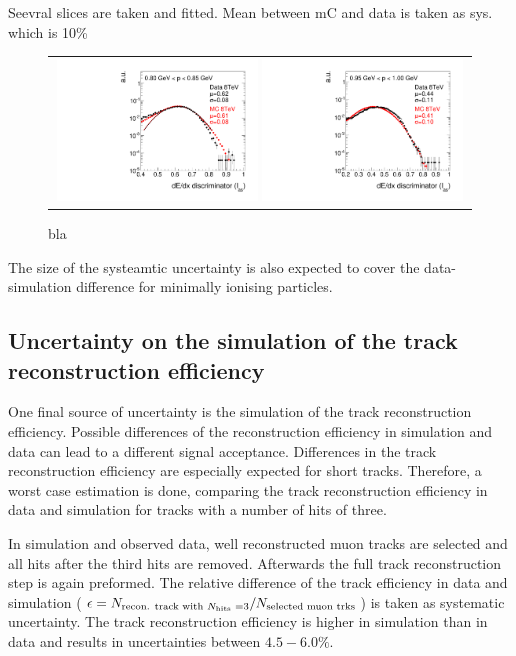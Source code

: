 Seevral slices are taken and fitted.
Mean between mC and data is taken as sys. which is 10\%
\begin{figure}[!h]
  \centering 
  \begin{tabular}{c}
    \includegraphics[width=0.49\textwidth]{figures/analysis/Interpretation/hIas_analysis_2015_11_30_ForThesis_ptmin0p80_ptmax0p85.pdf} 
    \includegraphics[width=0.49\textwidth]{figures/analysis/Interpretation/hIas_analysis_2015_11_30_ForThesis_ptmin0p95_ptmax1p0.pdf}
  \end{tabular}
  \caption{bla}
  \label{fig:optimisation}
\end{figure} 
The size of the systeamtic uncertainty is also expected to cover the data-simulation difference for minimally ionising particles.


\subsection*{Uncertainty on the simulation of the track reconstruction efficiency}
One final source of uncertainty is the simulation of the track reconstruction efficiency.
Possible differences of the reconstruction efficiency in simulation and data can lead to a different signal acceptance.
Differences in the track reconstruction efficiency are especially expected for short tracks.
Therefore, a worst case estimation is done, comparing the track reconstruction efficiency in data and simulation for tracks with a number of hits of three.

In simulation and observed data, well reconstructed muon tracks are selected and all hits after the third hits are removed.
Afterwards the full track reconstruction step is again preformed.
The relative difference of the track efficiency in data and simulation ($\epsilon = N_{\text{recon. track with \nhits=3}}/N_{\text{selected muon trks}}$) is taken as systematic uncertainty.
The track reconstruction efficiency is higher in simulation than in data and results in uncertainties between $4.5-6.0\%$.\\


